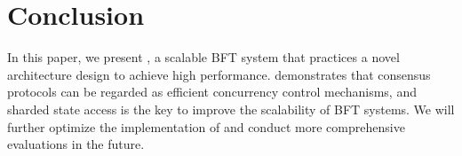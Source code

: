 \section{Conclusion}

In this paper, we present \sys, a scalable BFT system that practices a novel architecture design to achieve high performance.
\sys demonstrates that consensus protocols can be regarded as efficient concurrency control mechanisms, and sharded state access is the key to improve the scalability of BFT systems.
We will further optimize the implementation of \sys and conduct more comprehensive evaluations in the future.